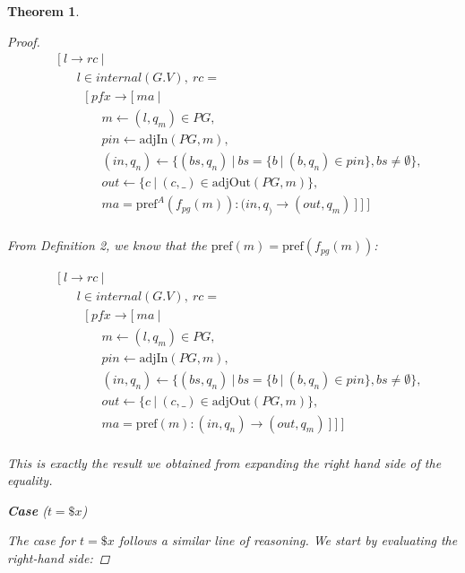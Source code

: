\documentclass[twocolumn, openany]{sig-alternate-10pt}
\newcommand{\Pref}{\ensuremath{\mathrm{pref}}}
\newtheorem{thm}{Theorem}
\begin{document}
\begin{thm}
\begin{proof}
    \[ \begin{array}{l}
     ~~~~~ [~ l \rightarrow rc ~\vert~ \\
     ~~~~~~~~~~~~ l \in internal(G.V), ~rc =  \\
     ~~~~~~~~~~~~~~~ [~ pfx \rightarrow [~ ma ~\vert~ \\
     ~~~~~~~~~~~~~~~~~~~~~ m \leftarrow (l,q_m) \in PG, \\
     ~~~~~~~~~~~~~~~~~~~~~ pin \leftarrow \text{adjIn}(PG,m), \\
     ~~~~~~~~~~~~~~~~~~~~~ (in,q_n) \leftarrow \{ (bs,q_n) ~\vert~ bs=\{b ~\vert~ (b,q_n) \in pin \}, bs \neq \emptyset \}, \\
     ~~~~~~~~~~~~~~~~~~~~~ out \leftarrow \{ c ~\vert~ (c,\_) \in \text{adjOut}(PG,m) \}, \\
     ~~~~~~~~~~~~~~~~~~~~~ ma = \Pref^A(f_{pg}(m)) : (in,q_) \rightarrow (out,q_m) ~] ~] ~]\\
  \end{array} \]%

  From Definition 2, we know that the $\Pref(m) = \Pref(f_{pg}(m))$:

    \[ \begin{array}{l}
     ~~~~~ [~ l \rightarrow rc ~\vert~ \\
     ~~~~~~~~~~~~ l \in internal(G.V), ~rc =  \\
     ~~~~~~~~~~~~~~~ [~ pfx \rightarrow [~ ma ~\vert~ \\
     ~~~~~~~~~~~~~~~~~~~~~ m \leftarrow (l,q_m) \in PG, \\
     ~~~~~~~~~~~~~~~~~~~~~ pin \leftarrow \text{adjIn}(PG,m), \\
     ~~~~~~~~~~~~~~~~~~~~~ (in,q_n) \leftarrow \{ (bs,q_n) ~\vert~ bs=\{b ~\vert~ (b,q_n) \in pin \}, bs \neq \emptyset \}, \\
     ~~~~~~~~~~~~~~~~~~~~~ out \leftarrow \{ c ~\vert~ (c,\_) \in \text{adjOut}(PG,m) \}, \\
     ~~~~~~~~~~~~~~~~~~~~~ ma = \Pref(m) : (in,q_n) \rightarrow (out,q_m) ~] ~] ~]\\
  \end{array} \]%

  This is exactly the result we obtained from expanding the right hand side of the equality.

  \vspace{2em}
  \noindent
  \textbf{Case} ($t = \$x$)
  \vspace{.4em}

    \noindent
    The case for $t = \$x$ follows a similar line of reasoning. We start by evaluating the right-hand side:


\end{proof}
\end{thm}
\end{document}
